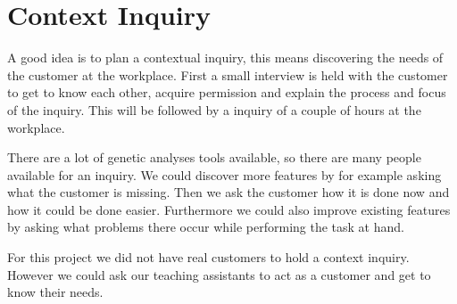 \section{Context Inquiry}
A good idea is to plan a contextual inquiry, this means discovering the needs of the customer at the workplace.
First a small interview is held with the customer to get to know each other, acquire permission and explain the process and focus of the inquiry.
This will be followed by a inquiry of a couple of hours at the workplace.

There are a lot of genetic analyses tools available, so there are many people available for an inquiry.
We could discover more features by for example asking what the customer is missing. 
Then we ask the customer how it is done now and how it could be done easier.
Furthermore we could also improve existing features by asking what problems there occur while performing the task at hand.

For this project we did not have real customers to hold a context inquiry. 
However we could ask our teaching assistants to act as a customer and get to know their needs.